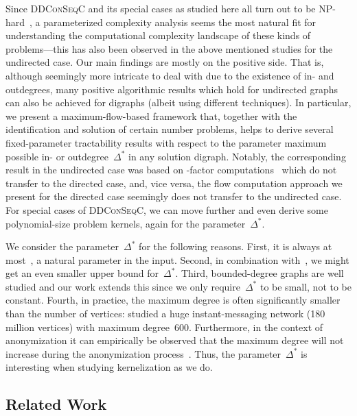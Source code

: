 \documentclass[a4paper,11pt]{article}
\theoremstyle{remark}
\theoremstyle{plain}
\theoremstyle{definition}
\newcommand{\DDCSC}{\textsc{DDConSeqC}\xspace}
\newcommand{\degpara}{\ensuremath{\Delta^*}\xspace}
\begin{document}
Since \DDCSC{} and its special cases as studied here all turn out 
to be NP-hard~\cite{Mil15,Kos15}, a parameterized complexity analysis
seems the most natural fit for understanding the computational
complexity landscape of these kinds of problems---this has also 
been observed in the above mentioned studies for the undirected case.
Our main findings are mostly on the positive side. That is,
although seemingly more intricate to deal with due to the 
existence of in- and outdegrees, many positive algorithmic results 
which hold for undirected graphs can also be achieved for 
digraphs (albeit using different techniques).
In particular, we present a maximum-flow-based framework that,
together with the identification and solution of certain number problems,
helps to derive several fixed-parameter tractability results with 
respect to the parameter maximum possible in- or outdegree~\degpara in any solution digraph.
Notably, the corresponding result in the undirected case was 
based on -factor computations~\cite{FNN16} which do not transfer 
to the directed case, and, vice versa, the flow computation 
approach we present for the directed case seemingly does not transfer to the 
undirected case. 
For special cases of \DDCSC{}, we can move further and even derive 
some polynomial-size problem kernels, again for the parameter~\degpara.

We consider the parameter~\degpara for the following reasons.
First, it is always at most~, a natural parameter in the input.
Second, in combination with~, we might get an even smaller upper bound for~\degpara.
Third, bounded-degree graphs are well studied and our work extends this since we only require~\degpara to be small, not to be constant.
Fourth, in practice, the maximum degree is often significantly smaller than the number of vertices:
\citet{LH08} studied a huge instant-messaging network (180 million vertices) with maximum degree~600.
Furthermore, in the context of anonymization it can empirically be observed that the maximum degree will not increase during the anonymization process~\cite{HHN14}. 
Thus, the parameter~\degpara is interesting when studying kernelization as we do. 


\subsection{Related Work}
\end{document}
